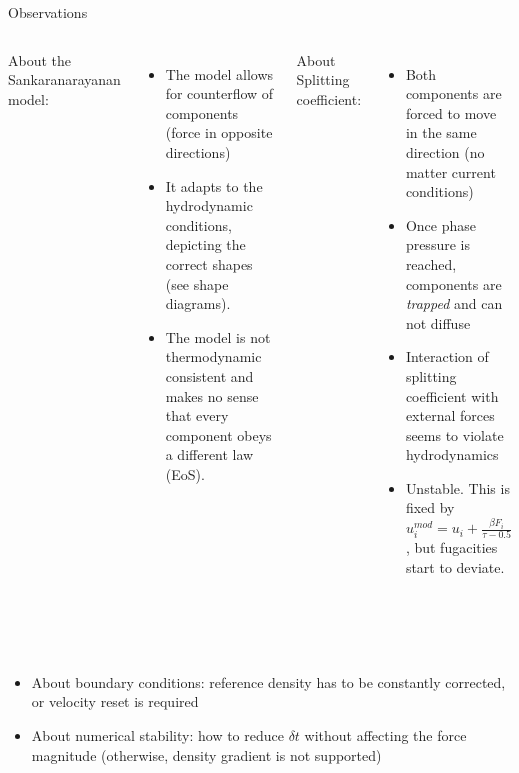 \documentclass[8pt]{beamer}
\begin{document}
	\begin{frame}{Observations}

		\begin{columns}[t]
			About the Sankaranarayanan model:
			\begin{itemize}
				\item The model allows for counterflow of components (force in opposite directions)
				\item It adapts to the hydrodynamic conditions, depicting the correct shapes (see shape diagrams).
				\item The model is not thermodynamic consistent and makes no sense that every component obeys a different law (EoS).
				
			\end{itemize}

			About Splitting coefficient:
			\begin{itemize}
				\item Both components are forced to move in the same direction (no matter current conditions)
				\item Once phase pressure is reached, components are \textit{trapped} and can not diffuse 
				\item Interaction of splitting coefficient with external forces seems to violate hydrodynamics
				\item Unstable. This is fixed by $u^{mod}_i = u_i + \frac{\beta F_i}{\tau - 0.5}$, but fugacities start to deviate.
			\end{itemize}
		\end{columns}
		~\\~\\
		\begin{itemize}
			\item About boundary conditions: reference density has to be constantly corrected, or velocity reset is required
			\item About numerical stability: how to reduce $\delta t$ without affecting the force magnitude (otherwise, density gradient is not supported)
		\end{itemize}
		
	\end{frame}
\end{document}
